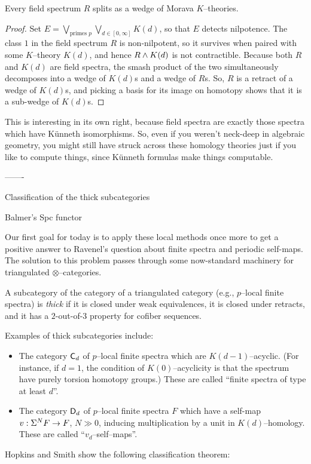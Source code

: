 \begin{theorem}
Every field spectrum $R$ splits as a wedge of Morava $K$--theories.
\end{theorem}
\begin{proof}
Set $E = \bigvee_{\text{primes $p$}} \bigvee_{d \in [0, \infty]} K(d)$, so that $E$ detects nilpotence.  The class $1$ in the field spectrum $R$ is non-nilpotent, so it survives when paired with some $K$--theory $K(d)$, and hence $R \wedge K(d)$ is not contractible.  Because both $R$ and $K(d)$ are field spectra, the smash product of the two simultaneously decomposes into a wedge of $K(d)$s and a wedge of $R$s.  So, $R$ is a retract of a wedge of $K(d)$s, and picking a basis for its image on homotopy shows that it is a sub-wedge of $K(d)$s.
\end{proof}

\noindent This is interesting in its own right, because field spectra are exactly those spectra which have K\"unneth isomorphisms.  So, even if you weren't neck-deep in algebraic geometry, you might still have struck across these homology theories just if you like to compute things, since K\"unneth formulas make things computable.

-------

Classification of the thick subcategories

Balmer's Spc functor


Our first goal for today is to apply these local methods once more to get a positive answer to Ravenel's question about finite spectra and periodic self-maps.  The solution to this problem passes through some now-standard machinery for triangulated $\otimes$--categories.

\begin{definition}
A subcategory of the category of a triangulated category (e.g., $p$--local finite spectra) is \textit{thick} if it is closed under weak equivalences, it is closed under retracts, and it has a $2$-out-of-$3$ property for cofiber sequences.
\end{definition}

\noindent Examples of thick subcategories include:
\begin{itemize}
\item The category $\mathsf{C}_d$ of $p$--local finite spectra which are $K(d-1)$--acyclic.  (For instance, if $d = 1$, the condition of $K(0)$--acyclicity is that the spectrum have purely torsion homotopy groups.)  These are called ``finite spectra of type at least $d$''.
\item The category $\mathsf{D}_d$ of $p$--local finite spectra $F$ which have a self-map $v: \Sigma^N F \to F$, $N \gg 0$, inducing multiplication by a unit in $K(d)$--homology.  These are called ``$v_d$--self--maps''.
\end{itemize}
Hopkins and Smith show the following classification theorem:

